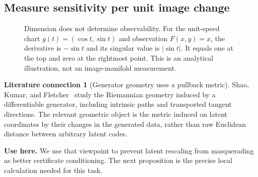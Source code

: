 \documentclass[11pt,a4paper]{article}
\theoremstyle{definition}
\theoremstyle{definition}
\newtheorem{literature}[theorem]{Literature connection}
\theoremstyle{remark}\newtheorem{remark}[theorem]{Remark}
\begin{document}
\subsection{Measure sensitivity per unit image change}

\begin{figure}[htbp]
\centering
{}
\caption{Dimension does not determine observability. For the unit-speed chart $g(t)=(\cos t,\sin t)$ and observation $F(x,y)=x$, the derivative is $-\sin t$ and its singular value is $|\sin t|$. It equals one at the top and zero at the rightmost point. This is an analytical illustration, not an image-manifold measurement.}
\label{fig:dimensionconditioning}
\end{figure}
\FloatBarrier

\begin{literature}[Generator geometry uses a pullback metric]
Shao, Kumar, and Fletcher~\cite{riemannian} study the Riemannian geometry induced by a differentiable generator, including intrinsic paths and transported tangent directions. The relevant geometric object is the metric induced on latent coordinates by their changes in the generated data, rather than raw Euclidean distance between arbitrary latent codes.

\textbf{Use here.} We use that viewpoint to prevent latent rescaling from masquerading as better certificate conditioning. The next proposition is the precise local calculation needed for this task.
\end{literature}
\end{document}
